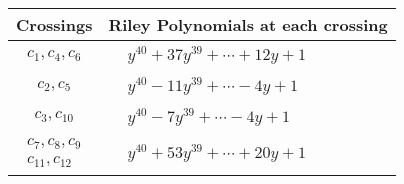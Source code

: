 \documentclass[1p]{elsarticle_modified}
\theoremstyle{definition}
\begin{document}
\begin{tabular}{m{50pt}|m{274pt}}
Crossings & \hspace{64pt}Riley Polynomials at each crossing \\
\hline $$\begin{aligned}c_{1},c_{4},c_{6}\end{aligned}$$&$\begin{aligned}
&y^{40}+37 y^{39}+\cdots+12 y+1
\end{aligned}$\\
\hline $$\begin{aligned}c_{2},c_{5}\end{aligned}$$&$\begin{aligned}
&y^{40}-11 y^{39}+\cdots-4 y+1
\end{aligned}$\\
\hline $$\begin{aligned}c_{3},c_{10}\end{aligned}$$&$\begin{aligned}
&y^{40}-7 y^{39}+\cdots-4 y+1
\end{aligned}$\\
\hline $$\begin{aligned}c_{7},c_{8},c_{9}\\c_{11},c_{12}\end{aligned}$$&$\begin{aligned}
&y^{40}+53 y^{39}+\cdots+20 y+1
\end{aligned}$\\
\hline
\end{tabular}
\vskip 2pc
\end{document}
